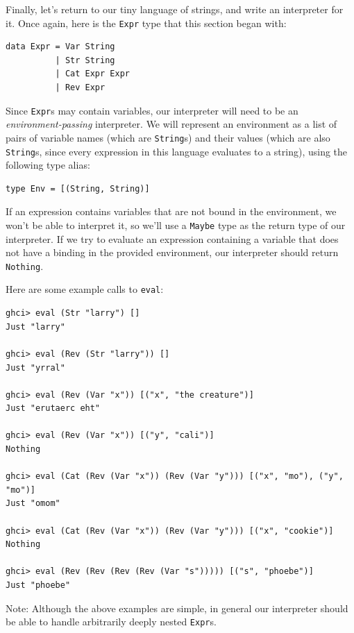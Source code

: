 \documentclass[addpoints]{exam}
\begin{document}
\begin{questions}
\newpage

Finally, let's return to our tiny language of strings, and write an interpreter for it. Once again, here is the \verb|Expr| type that this section began with:

\begin{verbatim}
data Expr = Var String
          | Str String
          | Cat Expr Expr
          | Rev Expr
\end{verbatim}

Since \verb|Expr|s may contain variables, our interpreter will need to be an \emph{environment-passing} interpreter.  We will represent an environment as a list of pairs of variable names (which are \verb|String|s) and their values (which are also \verb|String|s, since every expression in this language evaluates to a string), using the following type alias:

\begin{verbatim}
type Env = [(String, String)]
\end{verbatim}

If an expression contains variables that are not bound in the environment, we won't be able to interpret it, so we'll use a \verb|Maybe| type as the return type of our interpreter.  If we try to evaluate an expression containing a variable that does not have a binding in the provided environment, our interpreter should return \verb|Nothing|.

Here are some example calls to \verb|eval|:

\begin{verbatim}
ghci> eval (Str "larry") []
Just "larry"

ghci> eval (Rev (Str "larry")) []
Just "yrral"

ghci> eval (Rev (Var "x")) [("x", "the creature")]
Just "erutaerc eht"

ghci> eval (Rev (Var "x")) [("y", "cali")]
Nothing

ghci> eval (Cat (Rev (Var "x")) (Rev (Var "y"))) [("x", "mo"), ("y", "mo")]
Just "omom"

ghci> eval (Cat (Rev (Var "x")) (Rev (Var "y"))) [("x", "cookie")]
Nothing

ghci> eval (Rev (Rev (Rev (Rev (Var "s"))))) [("s", "phoebe")]
Just "phoebe"
\end{verbatim}

Note: Although the above examples are simple, in general our interpreter should be able to handle arbitrarily deeply nested \verb|Expr|s.

\newpage


\end{questions}
\end{document}

